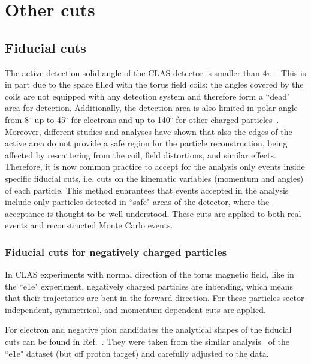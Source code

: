 \section{Other cuts}
\label{Sect:other_cuts}


\subsection{Fiducial cuts}
\label{Sect:fiduc} 

The active detection solid angle of the CLAS detector is smaller than $4\pi$~\cite{Mecking:2003zu}. This is in part due to the space filled with the torus field coils: the angles covered by the coils are not equipped with any detection system and therefore form a ``dead" area for detection. Additionally, the detection area is also limited in polar angle from 8$^{\circ}\mathrm{}$ up to 45$^{\circ}\mathrm{}$ for electrons and up to 140$^{\circ}\mathrm{}$ for other charged particles~\cite{Mecking:2003zu}. Moreover, different studies and analyses have shown that also the edges of the active area do not provide a safe region for the particle reconstruction, being affected by rescattering from the coil, field distortions, and similar effects. Therefore, it is now common practice to accept for the analysis only events inside specific fiducial cuts, i.e. cuts on the kinematic variables (momentum and angles) of each particle. This method guarantees that events accepted in the analysis include only particles detected in ``safe" areas of the detector, where the acceptance is thought to be well understood. These cuts are applied to both real events and reconstructed Monte Carlo events. 




\subsubsection{Fiducial cuts for negatively charged particles}
\label{Sect:fiduc_neg}

In CLAS experiments with normal direction of the torus magnetic field, like in the ``e1e" experiment, negatively charged particles are inbending, which means that their trajectories are bent in the forward direction. For these particles sector independent, symmetrical, and momentum dependent cuts are applied. 

For electron and negative pion candidates the analytical shapes of the fiducial cuts can be found in Ref.~\cite{my_an_note:2020}. They were taken from the similar analysis~\cite{Fed_an_note:2017} of the ``e1e" dataset (but off proton target) and carefully adjusted to the data.



